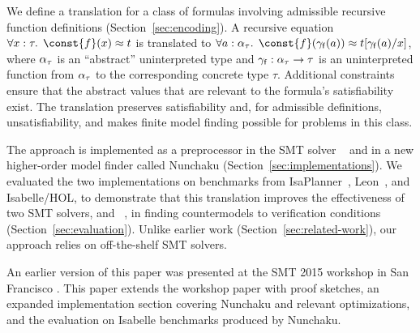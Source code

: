 We define a translation for a class of
formulas involving admissible recursive function definitions
(Section~\ref{sec:encoding}). A
recursive equation $\forall x : \tau.\;\, \const{f}(x) \teq t$
is translated to
$\forall a :\nobreak
\fargtype{\tau}.\allowbreak\;\, \const{f}(\farg{\con{f}}(a)) \teq t[\farg{\con{f}}(a)/x]$, where
$\alpha_{\tau}$ is an ``abstract'' uninterpreted type and $\gamma_{\mathsf{f}} :
\alpha_{\tau} \to \tau$ is an uninterpreted function
from $\alpha_{\tau}$ to the corresponding concrete type $\tau$. 
Additional constraints ensure that the abstract values that are relevant
to the formula's satisfiability
exist. The translation preserves satisfiability and, for admissible definitions,
unsatisfiability, and makes finite model finding possible for problems in this
class.

The approach is implemented as a preprocessor in the SMT solver
\cvc~\cite{barrett-et-al-2011} and in a new higher-order model finder called Nunchaku
(Section~\ref{sec:implementations}).
%
We evaluated the two implementations on benchmarks from
IsaPlanner~\cite{DBLP:conf/itp/JohanssonDB10}, Leon~\cite{blanc2013overview},
and Isabelle/HOL, to demonstrate that this translation improves the
effectiveness of two SMT solvers, \cvc  and 
\ziii~\cite{de-moura-bjoerner-2008}, in finding countermodels to
verification conditions (Section~\ref{sec:evaluation}). 
Unlike earlier work (Section~\ref{sec:related-work}),
our approach relies on off-the-shelf SMT solvers.

An earlier version of this paper was presented at the SMT 2015 workshop in San
Francisco \cite{reynolds-et-al-2015-smt}. This paper extends the workshop
paper with proof sketches, an expanded implementation section covering
Nunchaku and relevant \cvc optimizations, %
and the evaluation on Isabelle benchmarks produced by Nunchaku.

